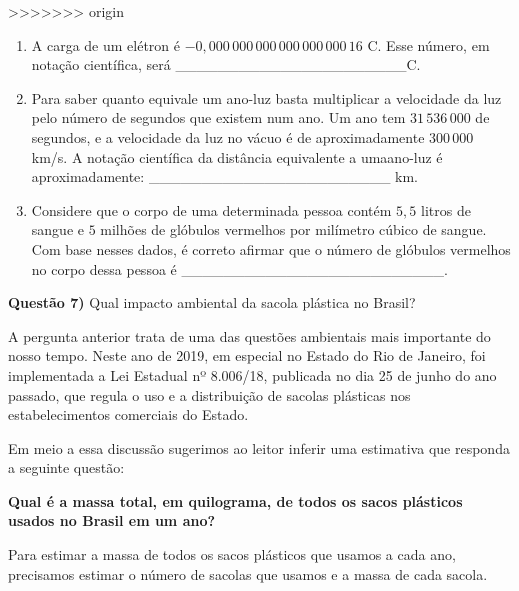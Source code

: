 \textgreater{}\textgreater{}\textgreater{}\textgreater{}\textgreater{}\textgreater{}\textgreater{} origin
\begin{enumerate}
\item {} 
A carga de um elétron é \(-0,000\,000\,000\,000\,000\,000\,16\) C. Esse número, em notação científica, será \_\_\_\_\_\_\_\_\_\_\_\_\_\_\_\_\_\_\_\_\_\_C.

\item {} 
Para saber quanto equivale um ano-luz basta multiplicar a velocidade da luz pelo número de segundos que existem num ano. Um ano tem \(31\, 536\, 000\) de segundos, e a velocidade da luz no vácuo é de aproximadamente \(300\,000\) km/s. A notação científica da distância equivalente a umaano-luz é aproximadamente:  \_\_\_\_\_\_\_\_\_\_\_\_\_\_\_\_\_\_\_\_\_\_\_ km.

\item {} 
Considere que o corpo de uma determinada pessoa contém \(5,5\) litros de sangue e \(5\) milhões de glóbulos vermelhos por milímetro cúbico de sangue. Com base nesses dados, é correto afirmar que o número de glóbulos vermelhos no corpo dessa pessoa é \_\_\_\_\_\_\_\_\_\_\_\_\_\_\_\_\_\_\_\_\_\_\_\_\_.

\end{enumerate}

\textbf{Questão 7)} Qual impacto ambiental da sacola plástica no Brasil?

A pergunta anterior trata de uma das questões ambientais mais importante do nosso tempo. Neste ano de 2019, em especial no Estado do Rio de Janeiro, foi implementada a Lei Estadual nº 8.006/18, publicada no dia 25 de junho do ano passado, que regula o uso e a distribuição de sacolas plásticas nos estabelecimentos comerciais do Estado.

Em meio a essa discussão sugerimos ao leitor inferir uma estimativa que responda a seguinte questão:

\textbf{Qual é a massa total, em quilograma, de todos os sacos plásticos usados no Brasil em um ano?}

Para estimar a massa de todos os sacos plásticos que usamos a cada ano, precisamos estimar o número de sacolas que usamos e a massa de cada sacola.

